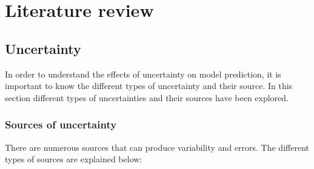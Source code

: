 \chapter{Literature review}
\label{chapterlabel4}

\section{Uncertainty}
In order to understand the effects of uncertainty on model prediction, it is important to know the different types of uncertainty and their source. In this section different types of uncertainties and their sources have been explored.

\subsection{Sources of uncertainty}
There are numerous sources that can produce variability and errors. The different types of sources are explained below:

